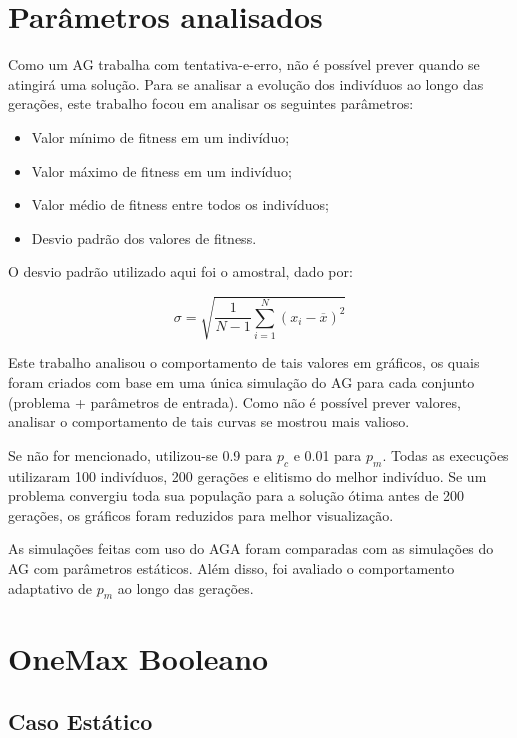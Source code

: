 \label{5_resultados}

\section{Parâmetros analisados}

Como um AG trabalha com tentativa-e-erro, não é possível prever quando se atingirá uma solução. Para se analisar a evolução dos indivíduos ao longo das gerações, este trabalho focou em analisar os seguintes parâmetros:

\begin{itemize}
	\item Valor mínimo de fitness em um indivíduo;
	\item Valor máximo de fitness em um indivíduo;
	\item Valor médio de fitness entre todos os indivíduos;
	\item Desvio padrão dos valores de fitness.
\end{itemize}

O desvio padrão utilizado aqui foi o amostral, dado por:

\begin{equation}
	\sigma = \sqrt{\frac{1}{N-1} \sum_{i=1}^N (x_i - \overline{x})^2}
\end{equation}

Este trabalho analisou o comportamento de tais valores em gráficos, os quais foram criados com base em uma única simulação do AG para cada conjunto (problema + parâmetros de entrada). Como não é possível prever valores, analisar o comportamento de tais curvas se mostrou mais valioso.

Se não for mencionado, utilizou-se 0.9 para $p_c$ e 0.01 para $p_m$. Todas as execuções utilizaram 100 indivíduos, 200 gerações e elitismo do melhor indivíduo. Se um problema convergiu toda sua população para a solução ótima antes de 200 gerações, os gráficos foram reduzidos para melhor visualização.

As simulações feitas com uso do AGA foram comparadas com as simulações do AG com parâmetros estáticos. Além disso, foi avaliado o comportamento adaptativo de $p_m$ ao longo das gerações.

\section{OneMax Booleano}

\subsection{Caso Estático}

